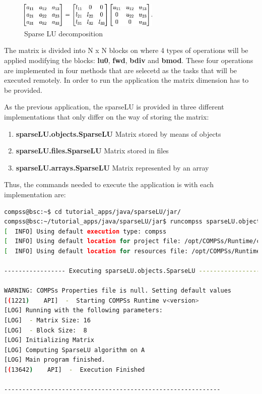 \begin{figure}[ht!]
  \centering
    \includegraphics[width=0.6\textwidth]{./Sections/2_Java/Figures/SparseLU.jpeg}
    \caption{Sparse LU decomposition}
    \label{fig:SparseLO}
\end{figure}

The matrix is divided into N x N blocks on where 4 types of operations will be applied modifying the blocks: 
{\bf lu0}, {\bf fwd}, {\bf bdiv} and {\bf bmod}. These four operations are implemented in four methods that 
are selecetd as the tasks that will be executed remotely. In order to run the application the matrix dimension 
has to be provided.

As the previous application, the sparseLU is provided in three different implementations that only differ on the way of storing
the matrix:
\begin{enumerate}
 \item \textbf{sparseLU.objects.SparseLU} Matrix stored by means of objects
 \item \textbf{sparseLU.files.SparseLU} Matrix stored in files
 \item \textbf{sparseLU.arrays.SparseLU} Matrix represented by an array
\end{enumerate}

Thus, the commands needed to execute the application is with each implementation are:

\begin{lstlisting}[language=bash]
compss@bsc:~$ cd tutorial_apps/java/sparseLU/jar/
compss@bsc:~/tutorial_apps/java/sparseLU/jar$ runcompss sparseLU.objects.SparseLU 16 8
[  INFO] Using default execution type: compss
[  INFO] Using default location for project file: /opt/COMPSs/Runtime/configuration/xml/projects/default_project.xml
[  INFO] Using default location for resources file: /opt/COMPSs/Runtime/configuration/xml/resources/default_resources.xml

----------------- Executing sparseLU.objects.SparseLU --------------------------

WARNING: COMPSs Properties file is null. Setting default values
[(1221)    API]  -  Starting COMPSs Runtime v<version>
[LOG] Running with the following parameters:
[LOG]  - Matrix Size: 16
[LOG]  - Block Size:  8
[LOG] Initializing Matrix
[LOG] Computing SparseLU algorithm on A
[LOG] Main program finished.
[(13642)    API]  -  Execution Finished

------------------------------------------------------------
\end{lstlisting}

